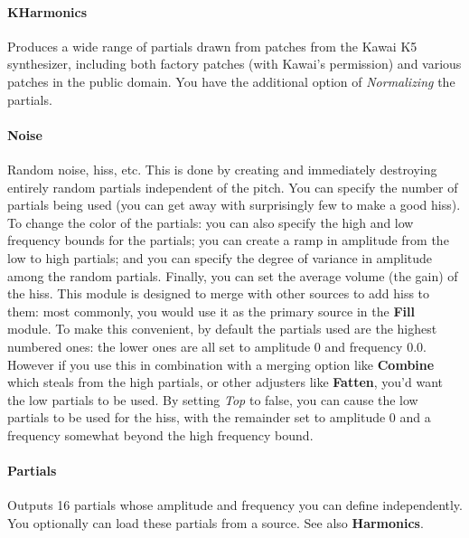 \documentclass{article}
\begin{document}
\paragraph{KHarmonics}  Produces a wide range of partials drawn from patches from the Kawai K5 synthesizer, including both factory patches (with Kawai's permission) and various patches in the public domain.  You have the additional option of {\it Normalizing} the partials.


\paragraph{Noise}  Random noise, hiss, etc.  This is done by creating and immediately destroying entirely random partials independent of the pitch.  You can specify the number of partials being used (you can get away with surprisingly few to make a good hiss).   To change the color of the partials: you can also specify the high and low frequency bounds for the partials; you can create a ramp in amplitude from the low to high partials; and you can specify the degree of variance in amplitude among the random partials.  Finally, you can set the average volume (the gain) of the hiss.  This module is designed to merge with other sources to add hiss to them: most commonly, you would use it as the primary source in the {\bf Fill} module.  To make this convenient, by default the partials used are the highest numbered ones: the lower ones are all set to amplitude 0 and frequency 0.0.  However if you use this in combination with a merging option like {\bf Combine} which steals from the high partials, or other adjusters like {\bf Fatten}, you'd want the low partials to be used.  By setting {\it Top} to false, you can cause the low partials to be used for the hiss, with the remainder set to amplitude 0 and a frequency somewhat beyond the high frequency bound.

\paragraph{Partials}  Outputs 16 partials whose amplitude and frequency you can define independently.  You optionally can load these partials from a source.  See also {\bf Harmonics}.
\end{document}
